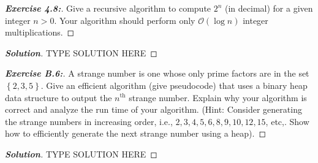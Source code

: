 \documentclass[a4paper]{article}
\newenvironment{solution}{\begin{proof}[\textnormal{\textbf{Solution}}]}{\end{proof}}
\newenvironment{exercise}[1]{\begin{proof}[\textnormal{\textbf{Exercise #1:}}]\renewcommand{\qedsymbol}{}}{\end{proof}}
\newcommand{\bigO}[1]{\mathcal{O}\left(#1\right)}
\newcommand{\set}[1]{\left\lbrace#1\right\rbrace}
\newcommand{\ith}[1]{#1^{\text{th}}}
\begin{document}
\begin{exercise}{4.8}
    Give a recursive algorithm to compute \(2^n\) (in decimal) for a given integer \(n > 0\). Your algorithm should perform only \(\bigO{\log n}\) integer multiplications.
\end{exercise}

\begin{solution}
    TYPE SOLUTION HERE
\end{solution}

\begin{exercise}{B.6}
    A strange number is one whose only prime factors are in the set \(\set{2, 3, 5}\). Give an efficient algorithm (give pseudocode) that uses a binary heap data structure to output the \(\ith{n}\) strange number. Explain why your algorithm is correct and analyze the run time of your algorithm. (Hint: Consider generating the strange numbers in increasing order, i.e., \(2,3,4,5,6,8,9,10,12,15\), etc,. Show how to efficiently generate the next strange number using a heap).
\end{exercise}

\begin{solution}
    TYPE SOLUTION HERE
\end{solution}
\end{document}
